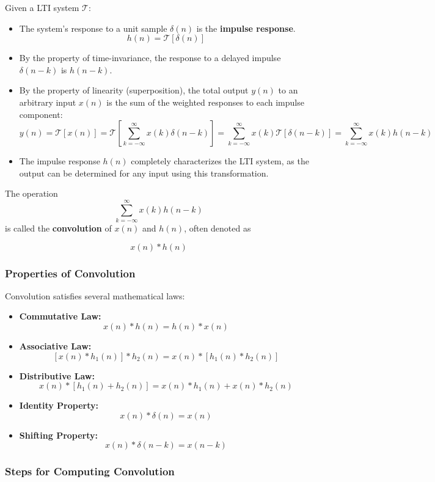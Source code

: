 Given a LTI system \(\mathcal{T}\):

\begin{itemize}
\tightlist
\item
  The system's response to a unit sample \(\delta(n)\) is the
  \textbf{impulse response}. \[h(n) = \mathcal{T}[\delta(n)]\]
\item
  By the property of time-invariance, the response to a delayed impulse
  \(\delta(n-k)\) is \(h(n-k)\).
\item
  By the property of linearity (superposition), the total output
  \(y(n)\) to an arbitrary input \(x(n)\) is the sum of the weighted
  responses to each impulse component: \[
    y(n) = \mathcal{T}[x(n)] = \mathcal{T}\left[\sum_{k=-\infty}^{\infty} x(k)\delta(n-k)\right] = \sum_{k=-\infty}^{\infty} x(k)\mathcal{T}[\delta(n-k)] = \sum_{k=-\infty}^{\infty} x(k)h(n-k)
    \]
\item
  The impulse response \(h(n)\) completely characterizes the LTI system,
  as the output can be determined for any input using this
  transformation.
\end{itemize}

The operation \[
\sum_{k=-\infty}^{\infty} x(k)h(n-k)
\] is called the \textbf{convolution} of \(x(n)\) and \(h(n)\), often
denoted as

\[x(n) * h(n)\]

\subsubsection{Properties of
Convolution}\label{properties-of-convolution}

Convolution satisfies several mathematical laws:

\begin{itemize}
\tightlist
\item
  \textbf{Commutative Law:} \[x(n) * h(n) = h(n) * x(n)\]
\item
  \textbf{Associative Law:}
  \[[x(n) * h_1(n)] * h_2(n) = x(n) * [h_1(n) * h_2(n)]\]
\item
  \textbf{Distributive Law:}
  \[x(n) * [h_1(n) + h_2(n)] = x(n) * h_1(n) + x(n) * h_2(n)\]
\item
  \textbf{Identity Property:} \[x(n) * \delta(n) = x(n)\]
\item
  \textbf{Shifting Property:} \[x(n) * \delta(n-k) = x(n-k)\]
\end{itemize}

\subsubsection{Steps for Computing
Convolution}\label{steps-for-computing-convolution}

